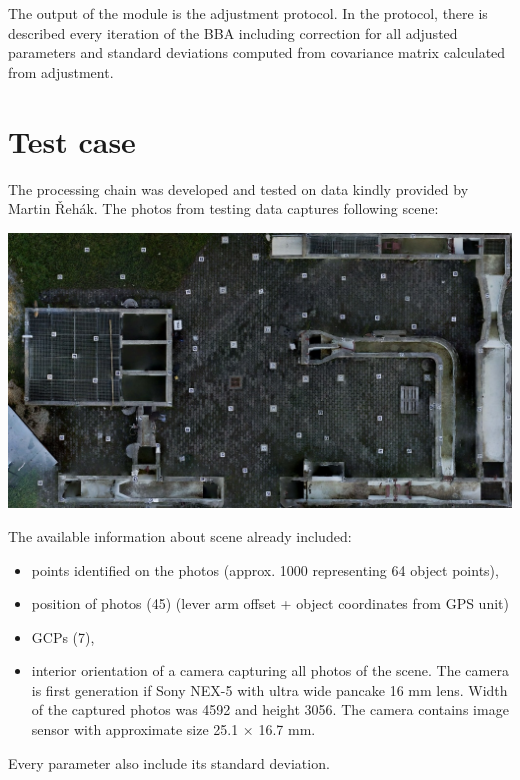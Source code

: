 \documentclass[a4paper,12pt]{article}
\begin{document}
The output of the module is the adjustment protocol. In the protocol, there
is described every iteration of the BBA including correction for all adjusted parameters and standard deviations computed from 
covariance matrix calculated from adjustment. 


\section{Test case}
\label{sec:test_case}

The processing chain was developed and tested on data kindly provided by Martin Řehák. 
The photos from testing data captures following scene:

\includegraphics[scale=0.4]{figures/calib_field.png}


The available information about scene already included:

\begin{itemize}
\item points identified on the photos (approx. 1000 representing 64 object points),
\item position of photos (45) (lever arm offset + object coordinates from GPS unit) 
\item GCPs (7),
\item interior orientation of a camera capturing all photos of the scene.
The camera is first generation if Sony NEX-5 with ultra wide pancake 16 mm lens.
Width of the captured photos was 4592 and height 3056.
The camera contains image sensor with approximate size 25.1 × 16.7 mm.
\end{itemize}
Every parameter also include its standard deviation. 

\end{document}
